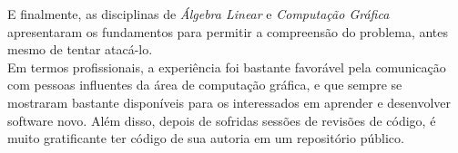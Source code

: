 E finalmente, as disciplinas de \emph{Álgebra Linear} e \emph{Computação Gráfica} apresentaram os fundamentos para permitir a compreensão do problema, antes mesmo de tentar atacá-lo. \\

Em termos profissionais, a experiência foi bastante favorável pela comunicação com pessoas influentes da área de computação gráfica, e que sempre se mostraram bastante disponíveis para os interessados em aprender e desenvolver software novo. Além disso, depois de sofridas sessões de revisões de código, é muito gratificante ter código de sua autoria em um repositório público.